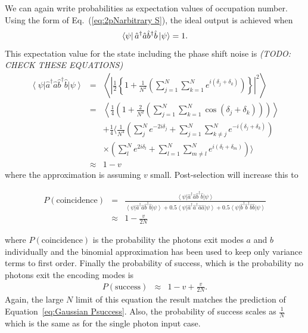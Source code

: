 \documentclass[aps,pra,twocolumn,superscriptaddress,numerical,floatfix]{revtex4-1}
\begin{document}
We can again write probabilities as expectation values of occupation number.  Using the form of Eq.~(\ref{eq:2pNarbitrary S}), the ideal output is achieved when
\begin{equation}
\bra{\psi}\hat{a}^{\dagger}\hat{a}\hat{b}^{\dagger}\hat{b}\ket{\psi} = 1.
\end{equation}
This expectation value for the state including the phase shift noise is
\emph{(TODO: CHECK THESE EQUATIONS)}
\begin{eqnarray}
\left\langle \psi\right|\hat{a}^{\dagger}\hat{a}\hat{b}^{\dagger}\hat{b}\left|\psi\right\rangle & = & \left\langle \left|\frac{1}{2}\left\{ 1+\frac{1}{N^{2}}\left(\sum_{j=1}^{N}\sum_{k=1}^{N}e^{i(\delta_{j}+\delta_{k})}\right)\right\} \right|^{2}\right\rangle \nonumber \\
& = & \left\langle \frac{1}{4}\left(1+\frac{2}{N^{2}}\left(\sum_{j=1}^{N}\sum_{k=1}^{N}\cos\left(\delta_{j}+\delta_{k}\right)\right)\right)\right\rangle \nonumber \\
&  & +\frac{1}{4}\Biggl\langle\frac{1}{N^{4}}\left(\sum_{j}^{N}e^{-2i\delta_{j}}+\sum_{j=1}^{N}\sum_{k\ne j}^{N}e^{-i(\delta_{j}+\delta_{k})}\right)\nonumber \\
&  & \times\left(\sum_{l}^{N}e^{2i\delta_{l}}+\sum_{l=1}^{N}\sum_{m\ne l}^{N}e^{i(\delta_{l}+\delta_{m})}\right)\Biggr\rangle\nonumber \\
& \approx & 1-v\label{eq:exp. value aabb}
\end{eqnarray}
where the approximation is assuming $v$ small.  Post-selection will increase this to 
\begin{widetext}
\begin{eqnarray}
P(\textrm{coincidence}) & = & \frac{\left\langle \psi\right|\hat{a}^{\dagger}\hat{a}\hat{b}^{\dagger}\hat{b}\left|\psi\right\rangle }{\left\langle \psi\right|\hat{a}^{\dagger}\hat{a}\hat{b}^{\dagger}\hat{b}\left|\psi\right\rangle +0.5\left\langle \psi\right|\hat{a}^{\dagger}\hat{a}^{\dagger}\hat{a}\hat{a}\left|\psi\right\rangle +0.5\left\langle \psi\right|\hat{b}^{\dagger}\hat{b}^{\dagger}\hat{b}\hat{b}\left|\psi\right\rangle }\nonumber \\
& \approx & 1-\frac{v}{2N}\label{eq:2pNarb PS}
\end{eqnarray}
\end{widetext}
where $P(\textrm{coincidence})$ is the probability the photons exit modes $a$ and $b$ individually and the binomial approximation has been used to keep only variance terms to first order.  Finally the probability of success, which is the probability no photons exit the encoding modes is 
\begin{eqnarray}
	P(\textrm{success}) & \approx & 1-v+\frac{v}{2N}.\label{eq:2pNarb Success}
\end{eqnarray}
Again, the large $N$ limit of this equation the result matches the prediction of Equation~\ref{eq:Gaussian Psuccess}. Also, the probability of success scales as $\frac{1}{N}$ which is the same as for the single photon input case.
\end{document}

